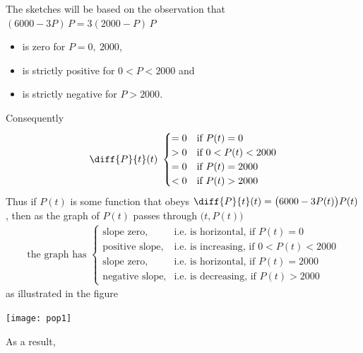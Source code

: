 \noindent The sketches will be based on the observation that
$(6000-3P)\,P=3(2000-P)\,P$
\begin{itemize} \itemsep1pt \parskip0pt
  \item is zero for $P=0,\ 2000$,
  \item is strictly positive for $0<P<2000$ and
  \item is strictly negative for $P>2000$.
\end{itemize}
Consequently
\begin{align*}
  \diff{P}{t}(t)\ \begin{cases}
                       =0  & \text{if }P(t)=0 \\
                        >0 & \text{if }0<P(t)<2000 \\
                        =0 & \text{if }P(t)=2000 \\
                        <0 & \text{if }P(t)>2000
                  \end{cases}
\end{align*}
Thus if $P(t)$ is some function that obeys
$\diff{P}{t}(t)=\big(6000-3P(t)\big)P(t)$, then as the graph of $P(t)$
passes through $\big(t,P(t)\big)$
\begin{align*}
\text{the graph has }
  \begin{cases}
      \text{slope zero,}& \text{i.e. is horizontal, \ \ if }P(t)=0  \\
      \text{positive slope,}& \text{i.e. is increasing, \ \ if }
                                                       0<P(t)<2000  \\
     \text{slope zero,}& \text{i.e. is horizontal, \ \ if }P(t)=2000  \\
          \text{negative slope,}& \text{i.e. is decreasing, \ \ if }P(t)>2000
  \end{cases}
\end{align*}
as illustrated in the figure
\begin{efig}
\begin{center}
  \texttt{[image: pop1]}
\end{center}
\end{efig}
As a result,
